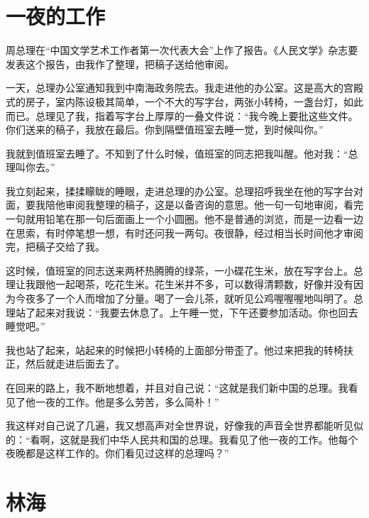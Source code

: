 \documentclass[12pt,UTF-8,openany]{ctexbook}
\begin{document}
\chapter{一夜的工作}

\begin{Large}
    
    周总理在“中国文学艺术工作者第一次代表大会”上作了报告。《人民文学》杂志要发表这个报告，由我作了整理，把稿子送给他审阅。
    
    一天，总理办公室通知我到中南海政务院去。我走进他的办公室。这是高大的宫殿式的房子，室内陈设极其简单，一个不大的写字台，两张小转椅，一盏台灯，如此而已。总理见了我，指着写字台上厚厚的一叠文件说：“我今晚上要批这些文件。你们送来的稿子，我放在最后。你到隔壁值班室去睡一觉，到时候叫你。”
    
    我就到值班室去睡了。不知到了什么时候，值班室的同志把我叫醒。他对我：“总理叫你去。”
    
    我立刻起来，揉揉矇眬的睡眼，走进总理的办公室。总理招呼我坐在他的写字台对面，要我陪他审阅我整理的稿子，这是以备咨询的意思。他一句一句地审阅，看完一句就用铅笔在那一句后面画上一个小圆圈。他不是普通的浏览，而是一边看一边在思索，有时停笔想一想，有时还问我一两句。夜很静，经过相当长时间他才审阅完，把稿子交给了我。
    
    这时候，值班室的同志送来两杯热腾腾的绿茶，一小碟花生米，放在写字台上。总理让我跟他一起喝茶，吃花生米。花生米并不多，可以数得清颗数，好像并没有因为今夜多了一个人而增加了分量。喝了一会儿茶，就听见公鸡喔喔喔地叫明了。总理站了起来对我说：“我要去休息了。上午睡一觉，下午还要参加活动。你也回去睡觉吧。”
    
    我也站了起来，站起来的时候把小转椅的上面部分带歪了。他过来把我的转椅扶正，然后就走进后面去了。
    
    在回来的路上，我不断地想着，并且对自己说：“这就是我们新中国的总理。我看见了他一夜的工作。他是多么劳苦，多么简朴！”
    
    我这样对自己说了几遍，我又想高声对全世界说，好像我的声音全世界都能听见似的：“看啊，这就是我们中华人民共和国的总理。我看见了他一夜的工作。他每个夜晚都是这样工作的。你们看见过这样的总理吗？”
    
\end{Large}

\chapter{林海}
\end{document}
